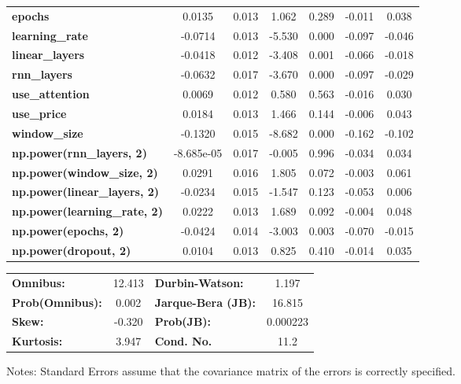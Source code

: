 \begin{center}
\begin{tabular}{lcccccc}
\textbf{epochs}                            &       0.0135  &        0.013     &     1.062  &         0.289        &       -0.011    &        0.038     \\
\textbf{learning\_rate}                    &      -0.0714  &        0.013     &    -5.530  &         0.000        &       -0.097    &       -0.046     \\
\textbf{linear\_layers}                    &      -0.0418  &        0.012     &    -3.408  &         0.001        &       -0.066    &       -0.018     \\
\textbf{rnn\_layers}                       &      -0.0632  &        0.017     &    -3.670  &         0.000        &       -0.097    &       -0.029     \\
\textbf{use\_attention}                    &       0.0069  &        0.012     &     0.580  &         0.563        &       -0.016    &        0.030     \\
\textbf{use\_price}                        &       0.0184  &        0.013     &     1.466  &         0.144        &       -0.006    &        0.043     \\
\textbf{window\_size}                      &      -0.1320  &        0.015     &    -8.682  &         0.000        &       -0.162    &       -0.102     \\
\textbf{np.power(rnn\_layers, 2)}          &   -8.685e-05  &        0.017     &    -0.005  &         0.996        &       -0.034    &        0.034     \\
\textbf{np.power(window\_size, 2)}         &       0.0291  &        0.016     &     1.805  &         0.072        &       -0.003    &        0.061     \\
\textbf{np.power(linear\_layers, 2)}       &      -0.0234  &        0.015     &    -1.547  &         0.123        &       -0.053    &        0.006     \\
\textbf{np.power(learning\_rate, 2)}       &       0.0222  &        0.013     &     1.689  &         0.092        &       -0.004    &        0.048     \\
\textbf{np.power(epochs, 2)}               &      -0.0424  &        0.014     &    -3.003  &         0.003        &       -0.070    &       -0.015     \\
\textbf{np.power(dropout, 2)}              &       0.0104  &        0.013     &     0.825  &         0.410        &       -0.014    &        0.035     \\
\bottomrule
\end{tabular}
\begin{tabular}{lclc}
\textbf{Omnibus:}       & 12.413 & \textbf{  Durbin-Watson:     } &    1.197  \\
\textbf{Prob(Omnibus):} &  0.002 & \textbf{  Jarque-Bera (JB):  } &   16.815  \\
\textbf{Skew:}          & -0.320 & \textbf{  Prob(JB):          } & 0.000223  \\
\textbf{Kurtosis:}      &  3.947 & \textbf{  Cond. No.          } &     11.2  \\
\bottomrule
\end{tabular}
\end{center}

Notes: \newline
 [1] Standard Errors assume that the covariance matrix of the errors is correctly specified.